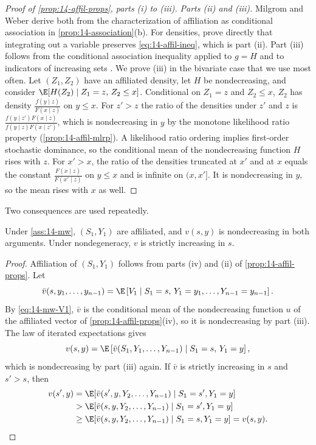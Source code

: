 \begin{proof}[Proof of \cref{prop:14-affil-props}, parts (i) to (iii)]
\emph{Parts (ii) and (iii).} Milgrom and Weber derive both from the characterization of affiliation as
conditional association in \cref{prop:14-association}(b). For densities, \citet{KarlinRinott1980} prove
directly that integrating out a variable preserves \eqref{eq:14-affil-ineq}, which is part (ii). Part (iii)
follows from the conditional association inequality applied to $g=H$ and to indicators of increasing sets
\citep[see also][]{Whitt1982}. We prove (iii) in the bivariate case that we use most often. Let $(Z_1,Z_2)$
have an affiliated density, let $H$ be nondecreasing, and consider $\E[H(Z_2)\mid Z_1=z,\,Z_2\le x]$.
Conditional on $Z_1=z$ and $Z_2\le x$, $Z_2$ has density $\frac{f(y\mid z)}{F(x\mid z)}$ on $y\le x$. For
$z'>z$ the ratio of the densities under $z'$ and $z$ is $\frac{f(y\mid z')F(x\mid z)}{f(y\mid z)F(x\mid z')}$,
which is nondecreasing in $y$ by the monotone likelihood ratio property (\cref{prop:14-affil-mlrp}). A
likelihood ratio ordering implies first-order stochastic dominance, so the conditional mean of the
nondecreasing function $H$ rises with $z$. For $x'>x$, the ratio of the densities truncated at $x'$ and at
$x$ equals the constant $\frac{F(x\mid z)}{F(x'\mid z)}$ on $y\le x$ and is infinite on $(x,x']$. It is
nondecreasing in $y$, so the mean rises with $x$ as well.
\end{proof}

Two consequences are used repeatedly.

\begin{corollary}\label{cor:14-mw-v}
Under \cref{ass:14-mw}, $(S_1,Y_1)$ are affiliated, and $v(s,y)$ is nondecreasing in both arguments. Under
nondegeneracy, $v$ is strictly increasing in $s$.
\end{corollary}

\begin{proof}
Affiliation of $(S_1,Y_1)$ follows from parts (iv) and (ii) of \cref{prop:14-affil-props}. Let
\begin{equation*}
  \bar v(s,y_1,\dots,y_{n-1})=\E\left[V_1\mid S_1=s,\,Y_1=y_1,\dots,Y_{n-1}=y_{n-1}\right].
\end{equation*}
By \eqref{eq:14-mw-V1}, $\bar v$ is the conditional mean of the nondecreasing function $u$ of the affiliated
vector of \cref{prop:14-affil-props}(iv), so it is nondecreasing by part (iii). The law of iterated
expectations gives
\begin{equation*}
  v(s,y)=\E\left[\bar v(S_1,Y_1,\dots,Y_{n-1})\mid S_1=s,\,Y_1=y\right],
\end{equation*}
which is nondecreasing by part (iii) again. If $\bar v$ is strictly increasing in $s$ and $s'>s$, then
\begin{align*}
  v(s',y)&=\E[\bar v(s',y,Y_2,\dots,Y_{n-1})\mid S_1=s',Y_1=y]\\
  &>\E[\bar v(s,y,Y_2,\dots,Y_{n-1})\mid S_1=s',Y_1=y]\\
  &\ge\E[\bar v(s,y,Y_2,\dots,Y_{n-1})\mid S_1=s,Y_1=y]=v(s,y).\qedhere
\end{align*}
\end{proof}

